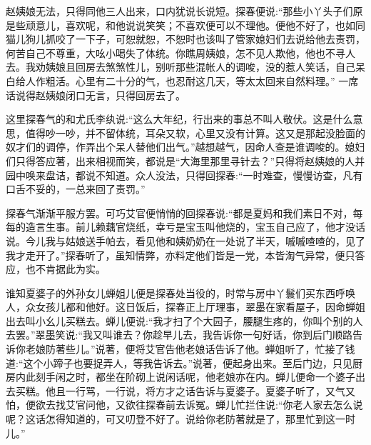 \begin{parag}
    赵姨娘无法，只得同他三人出来，口内犹说长说短。探春便说:“那些小丫头子们原是些顽意儿，喜欢呢，和他说说笑笑；不喜欢便可以不理他。便他不好了，也如同猫儿狗儿抓咬了一下子，可恕就恕，不恕时也该叫了管家媳妇们去说给他去责罚，何苦自己不尊重，大吆小喝失了体统。你瞧周姨娘，怎不见人欺他，他也不寻人去。我劝姨娘且回房去煞煞性儿，别听那些混帐人的调唆，没的惹人笑话，自己呆白给人作粗活。心里有二十分的气，也忍耐这几天，等太太回来自然料理。” 一席话说得赵姨娘闭口无言，只得回房去了。
\end{parag}


\begin{parag}
    这里探春气的和尤氏李纨说:“这么大年纪，行出来的事总不叫人敬伏。这是什么意思，值得吵一吵，并不留体统，耳朵又软，心里又没有计算。这又是那起没脸面的奴才们的调停，作弄出个呆人替他们出气。”越想越气，因命人查是谁调唆的。媳妇们只得答应著，出来相视而笑，都说是“大海里那里寻针去？”只得将赵姨娘的人并园中唤来盘诘，都说不知道。众人没法，只得回探春:“一时难查，慢慢访查，凡有口舌不妥的，一总来回了责罚。”
\end{parag}


\begin{parag}
    探春气渐渐平服方罢。可巧艾官便悄悄的回探春说:“都是夏妈和我们素日不对，每每的造言生事。前儿赖藕官烧纸，幸亏是宝玉叫他烧的，宝玉自己应了，他才没话说。今儿我与姑娘送手帕去，看见他和姨奶奶在一处说了半天，嘁嘁喳喳的，见了我才走开了。”探春听了，虽知情弊，亦料定他们皆是一党，本皆淘气异常，便只答应，也不肯据此为实。
\end{parag}


\begin{parag}
    谁知夏婆子的外孙女儿蝉姐儿便是探春处当役的，时常与房中丫鬟们买东西呼唤人，众女孩儿都和他好。这日饭后，探春正上厅理事，翠墨在家看屋子，因命蝉姐出去叫小幺儿买糕去。蝉儿便说:“我才扫了个大园子，腰腿生疼的，你叫个别的人去罢。”翠墨笑说:“我又叫谁去？你趁早儿去，我告诉你一句好话，你到后门顺路告诉你老娘防著些儿。”说著，便将艾官告他老娘话告诉了他。蝉姐听了，忙接了钱道:“这个小蹄子也要捉弄人，等我告诉去。”说著，便起身出来。至后门边，只见厨房内此刻手闲之时，都坐在阶砌上说闲话呢，他老娘亦在内。蝉儿便命一个婆子出去买糕。他且一行骂，一行说，将方才之话告诉与夏婆子。夏婆子听了，又气又怕，便欲去找艾官问他，又欲往探春前去诉冤。蝉儿忙拦住说:“你老人家去怎么说呢？这话怎得知道的，可又叨登不好了。说给你老防著就是了，那里忙到这一时儿。”
\end{parag}


